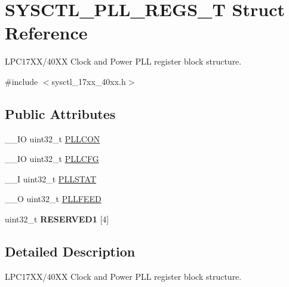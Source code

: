 \hypertarget{struct_s_y_s_c_t_l___p_l_l___r_e_g_s___t}{\section{S\+Y\+S\+C\+T\+L\+\_\+\+P\+L\+L\+\_\+\+R\+E\+G\+S\+\_\+\+T Struct Reference}
\label{struct_s_y_s_c_t_l___p_l_l___r_e_g_s___t}
}


L\+P\+C17\+X\+X/40\+X\+X Clock and Power P\+L\+L register block structure.  




{\ttfamily \#include $<$sysctl\+\_\+17xx\+\_\+40xx.\+h$>$}

\subsection*{Public Attributes}
\begin{DoxyCompactItemize}
\item 
\+\_\+\+\_\+\+I\+O uint32\+\_\+t \hyperlink{struct_s_y_s_c_t_l___p_l_l___r_e_g_s___t_a1fb97445f7a92913133769bb098df316}{P\+L\+L\+C\+O\+N}
\item 
\+\_\+\+\_\+\+I\+O uint32\+\_\+t \hyperlink{struct_s_y_s_c_t_l___p_l_l___r_e_g_s___t_a7f6a92521303bcd5522acdac74af3210}{P\+L\+L\+C\+F\+G}
\item 
\+\_\+\+\_\+\+I uint32\+\_\+t \hyperlink{struct_s_y_s_c_t_l___p_l_l___r_e_g_s___t_a9cc1486fbc5a9888ccdd70df2b57ebec}{P\+L\+L\+S\+T\+A\+T}
\item 
\+\_\+\+\_\+\+O uint32\+\_\+t \hyperlink{struct_s_y_s_c_t_l___p_l_l___r_e_g_s___t_a658116aa66b1d9e27f12cf0e429663f7}{P\+L\+L\+F\+E\+E\+D}
\item 
\hypertarget{struct_s_y_s_c_t_l___p_l_l___r_e_g_s___t_a8f564110c46a5fba4e6d306cd4137bd3}{uint32\+\_\+t {\bfseries R\+E\+S\+E\+R\+V\+E\+D1} \mbox{[}4\mbox{]}}\label{struct_s_y_s_c_t_l___p_l_l___r_e_g_s___t_a8f564110c46a5fba4e6d306cd4137bd3}

\end{DoxyCompactItemize}


\subsection{Detailed Description}
L\+P\+C17\+X\+X/40\+X\+X Clock and Power P\+L\+L register block structure. 

